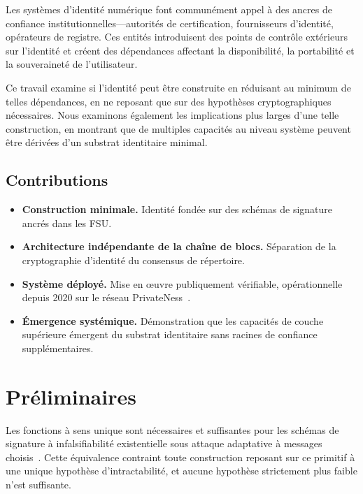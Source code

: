 \documentclass[11pt,a4paper]{article}
\begin{document}
Les systèmes d'identité numérique font communément appel à des ancres de
confiance institutionnelles---autorités de certification, fournisseurs
d'identité, opérateurs de registre.  Ces entités introduisent des points de
contrôle extérieurs sur l'identité et créent des dépendances affectant la
disponibilité, la portabilité et la souveraineté de l'utilisateur.

Ce travail examine si l'identité peut être construite en réduisant au minimum
de telles dépendances, en ne reposant que sur des hypothèses cryptographiques
nécessaires.  Nous examinons également les implications plus larges d'une
telle construction, en montrant que de multiples capacités au niveau système
peuvent être dérivées d'un substrat identitaire minimal.

\subsection{Contributions}

\begin{itemize}[leftmargin=*]
  \item \textbf{Construction minimale.}  Identité fondée sur des schémas de
    signature ancrés dans les FSU.
  \item \textbf{Architecture indépendante de la chaîne de blocs.}  Séparation
    de la cryptographie d'identité du consensus de répertoire.
  \item \textbf{Système déployé.}  Mise en œuvre publiquement vérifiable,
    opérationnelle depuis 2020 sur le réseau PrivateNess~\cite{onchain}.
  \item \textbf{Émergence systémique.}  Démonstration que les capacités de
    couche supérieure émergent du substrat identitaire sans racines de
    confiance supplémentaires.
\end{itemize}

\section{Préliminaires}

Les fonctions à sens unique sont nécessaires et suffisantes pour les schémas
de signature à infalsifiabilité existentielle sous attaque adaptative à
messages choisis~\cite{rompel1990}.  Cette équivalence contraint toute
construction reposant sur ce primitif à une unique hypothèse d'intractabilité,
et aucune hypothèse strictement plus faible n'est suffisante.
\end{document}
